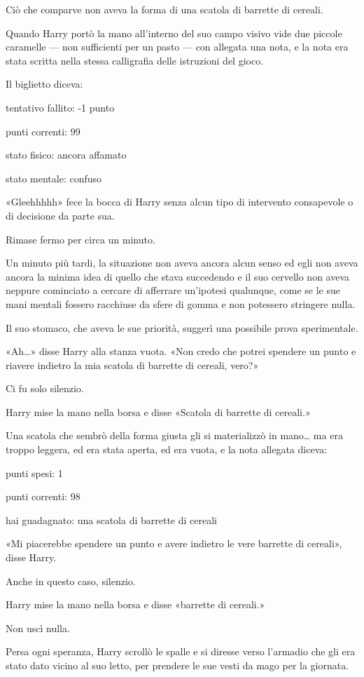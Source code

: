 Ciò che comparve non aveva la forma di una scatola di barrette di cereali.

Quando Harry portò la mano all’interno del suo campo visivo vide due piccole caramelle — non sufficienti per un pasto — con allegata una nota, e la nota era stata scritta nella stessa calligrafia delle istruzioni del gioco.

Il biglietto diceva:

tentativo fallito: -1 punto

punti correnti: 99

stato fisico: ancora affamato

stato mentale: confuso

«Gleehhhhh» fece la bocca di Harry senza alcun tipo di intervento consapevole o di decisione da parte sua.

Rimase fermo per circa un minuto.

Un minuto più tardi, la situazione non aveva ancora alcun senso ed egli non aveva ancora la minima idea di quello che stava succedendo e il suo cervello non aveva neppure cominciato a cercare di afferrare un’ipotesi qualunque, come se le sue mani mentali fossero racchiuse da sfere di gomma e non potessero stringere nulla.

Il suo stomaco, che aveva le sue priorità, suggerì una possibile prova sperimentale.

«Ah…» disse Harry alla stanza vuota. «Non credo che potrei spendere un punto e riavere indietro la mia scatola di barrette di cereali, vero?»

Ci fu solo silenzio.

Harry mise la mano nella borsa e disse «Scatola di barrette di cereali.»

Una scatola che sembrò della forma giusta gli si materializzò in mano… ma era troppo leggera, ed era stata aperta, ed era vuota, e la nota allegata diceva:

punti spesi: 1

punti correnti: 98

hai guadagnato: una scatola di barrette di cereali

«Mi piacerebbe spendere un punto e avere indietro le vere barrette di cereali», disse Harry.

Anche in questo caso, silenzio.

Harry mise la mano nella borsa e disse «barrette di cereali.»

Non uscì nulla.

Persa ogni speranza, Harry scrollò le spalle e si diresse verso l’armadio che gli era stato dato vicino al suo letto, per prendere le sue vesti da mago per la giornata.

